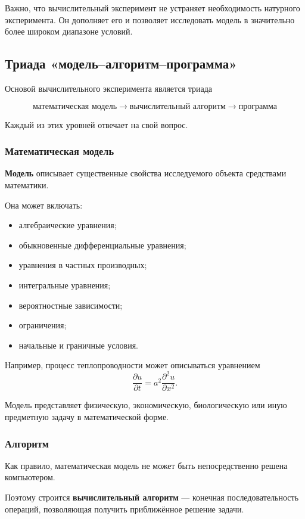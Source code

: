 Важно, что вычислительный эксперимент не устраняет необходимость натурного эксперимента. Он дополняет его и позволяет исследовать модель в значительно более широком диапазоне условий.


\subsection{Триада «модель--алгоритм--программа»}

Основой вычислительного эксперимента является триада

\[
\boxed{\text{математическая модель}
	\longrightarrow
	\text{вычислительный алгоритм}
	\longrightarrow
	\text{программа}}
\]

Каждый из этих уровней отвечает на свой вопрос.

\subsubsection*{Математическая модель}

\textbf{Модель} описывает существенные свойства исследуемого объекта средствами математики.

Она может включать:
\begin{itemize}
	\item алгебраические уравнения;
	\item обыкновенные дифференциальные уравнения;
	\item уравнения в частных производных;
	\item интегральные уравнения;
	\item вероятностные зависимости;
	\item ограничения;
	\item начальные и граничные условия.
\end{itemize}

Например, процесс теплопроводности может описываться уравнением
\[
\frac{\partial u}{\partial t}
=
a^2\frac{\partial^2u}{\partial x^2}.
\]

Модель представляет физическую, экономическую, биологическую или иную предметную задачу в математической форме.

\subsubsection*{Алгоритм}

Как правило, математическая модель не может быть непосредственно решена компьютером.

Поэтому строится \textbf{вычислительный алгоритм} --- конечная последовательность операций, позволяющая получить приближённое решение задачи.


